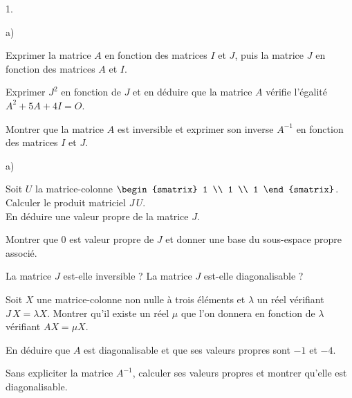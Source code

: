 \documentclass[11pt]{article}%
\begin{document}
\begin{noliste}{1.}
 \setlength{\itemsep}{4mm}
\item 

\begin{noliste}{a)}
 \setlength{\itemsep}{2mm}
\item Exprimer la matrice $A$ en fonction des matrices $I$ et $J$, puis
la
matrice $J$ en fonction des matrices $A$ et $I$.

\item Exprimer $J^{2}$ en fonction de $J$ et en déduire que la matrice
$A$ vérifie l'égalité $A^{2} + 5A + 4I = O$.

\item Montrer que la matrice $A$ est inversible et exprimer son inverse
$A^{-1}$ en fonction des matrices $I$ et $J$.
\end{noliste}

\item 

\begin{noliste}{a)}
 \setlength{\itemsep}{2mm}
\item Soit $U$ la matrice-colonne $\begin{smatrix}
1 \\
1 \\
1
\end{smatrix}
$. Calculer le produit matriciel $J\,U$. \\
En déduire une valeur propre de la matrice $J$.

\item Montrer que $0$ est valeur propre de $J$ et donner une base du
sous-espace propre associé.

\item La matrice $J$ est-elle inversible ? La matrice $J$ est-elle
diagonalisable ?

\item Soit $X$ une matrice-colonne non nulle à trois éléments et
$\lambda $
un réel vérifiant $J\,X = \lambda X$. Montrer qu'il existe un réel $\mu
$ que
l'on donnera en fonction de $\lambda $ vérifiant $AX = \mu X$.

\item En déduire que $A$ est diagonalisable et que ses valeurs propres
sont $-1$ et $-4$.

\item Sans expliciter la matrice $A^{-1}$, calculer ses valeurs propres
et
montrer qu'elle est diagonalisable.
\end{noliste}


\end{noliste}
\end{document}
